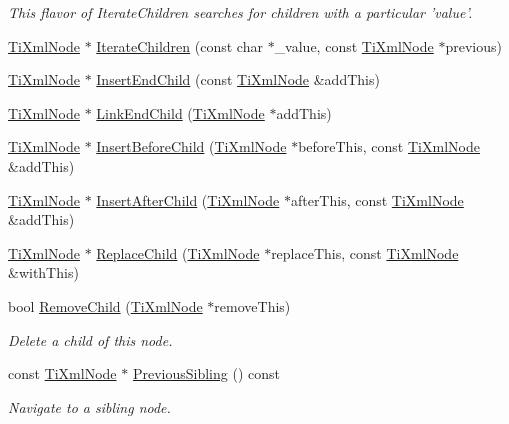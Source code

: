 \begin{DoxyCompactItemize}
\begin{DoxyCompactList}\small\item\em This flavor of IterateChildren searches for children with a particular 'value'. \item\end{DoxyCompactList}\item 
\hyperlink{class_ti_xml_node}{TiXmlNode} $\ast$ \hyperlink{class_ti_xml_node_a67ba8275e533e6f76340236c42ea0aea}{IterateChildren} (const char $\ast$\_\-value, const \hyperlink{class_ti_xml_node}{TiXmlNode} $\ast$previous)
\item 
\hyperlink{class_ti_xml_node}{TiXmlNode} $\ast$ \hyperlink{class_ti_xml_node_af287a913ce46d8dbf7ef24fec69bbaf0}{InsertEndChild} (const \hyperlink{class_ti_xml_node}{TiXmlNode} \&addThis)
\item 
\hyperlink{class_ti_xml_node}{TiXmlNode} $\ast$ \hyperlink{class_ti_xml_node_a1a881212554b759865f6cac79a851d38}{LinkEndChild} (\hyperlink{class_ti_xml_node}{TiXmlNode} $\ast$addThis)
\item 
\hyperlink{class_ti_xml_node}{TiXmlNode} $\ast$ \hyperlink{class_ti_xml_node_a71e54e393336382bc9875f64aab5cb15}{InsertBeforeChild} (\hyperlink{class_ti_xml_node}{TiXmlNode} $\ast$beforeThis, const \hyperlink{class_ti_xml_node}{TiXmlNode} \&addThis)
\item 
\hyperlink{class_ti_xml_node}{TiXmlNode} $\ast$ \hyperlink{class_ti_xml_node_a274db3292218202805c093f66a964cb5}{InsertAfterChild} (\hyperlink{class_ti_xml_node}{TiXmlNode} $\ast$afterThis, const \hyperlink{class_ti_xml_node}{TiXmlNode} \&addThis)
\item 
\hyperlink{class_ti_xml_node}{TiXmlNode} $\ast$ \hyperlink{class_ti_xml_node_a543208c2c801c84a213529541e904b9f}{ReplaceChild} (\hyperlink{class_ti_xml_node}{TiXmlNode} $\ast$replaceThis, const \hyperlink{class_ti_xml_node}{TiXmlNode} \&withThis)
\item 
bool \hyperlink{class_ti_xml_node_ae19d8510efc90596552f4feeac9a8fbf}{RemoveChild} (\hyperlink{class_ti_xml_node}{TiXmlNode} $\ast$removeThis)
\begin{DoxyCompactList}\small\item\em Delete a child of this node. \item\end{DoxyCompactList}\item 
const \hyperlink{class_ti_xml_node}{TiXmlNode} $\ast$ \hyperlink{class_ti_xml_node_ac2cd892768726270e511b2ab32de4d10}{PreviousSibling} () const 
\begin{DoxyCompactList}\small\item\em Navigate to a sibling node. \item\end{DoxyCompactList}\item 

\end{DoxyCompactItemize}
